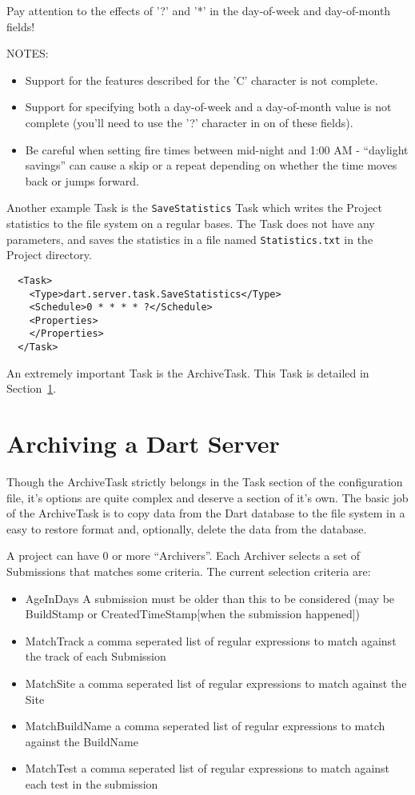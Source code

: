\documentclass{InsightBook}
\begin{document}
Pay attention to the effects of '?' and '*' in the day-of-week and day-of-month fields!

NOTES:
\begin{itemize}
    \item Support for the features described for the 'C' character is not complete.
    \item Support for specifying both a day-of-week and a day-of-month value is not complete (you'll need to use the '?' character in on of these fields).
    \item Be careful when setting fire times between mid-night and
1:00 AM - ``daylight savings'' can cause a skip or a repeat depending on
whether the time moves back or jumps forward.
\end{itemize}



Another example Task is the \texttt{SaveStatistics} Task which writes
the Project statistics to the file system on a regular bases.  The Task
does not have any parameters, and saves the statistics in a file named
\texttt{Statistics.txt} in the Project directory.
\begin{verbatim}
  <Task>
    <Type>dart.server.task.SaveStatistics</Type>
    <Schedule>0 * * * * ?</Schedule>
    <Properties>
    </Properties>
  </Task>
\end{verbatim}


An extremely important Task is the ArchiveTask.  This Task is detailed
in Section~\ref{Section:ArchiveTask}.

\section{Archiving a Dart Server}
\label{Section:ArchiveTask}

Though the ArchiveTask strictly belongs in the Task section of the
configuration file, it's options are quite complex and deserve a
section of it's own.  The basic job of the ArchiveTask is to copy data
from the Dart database to the file system in a easy to restore format
and, optionally, delete the data from the database.



A project can have 0 or more ``Archivers''.  Each Archiver selects a set
of Submissions that matches some criteria.  The current selection criteria are:

\begin{itemize}
\item AgeInDays  A submission must be older than this to be considered (may be BuildStamp or CreatedTimeStamp[when the submission happened])
\item MatchTrack a comma seperated list of regular expressions to match against the track of each Submission
\item MatchSite a comma seperated list of regular expressions to match against the Site
\item MatchBuildName a comma seperated list of regular expressions to match against the BuildName
\item MatchTest a comma seperated list of regular expressions to match
against each test in the submission
\end{itemize}
\end{document}
